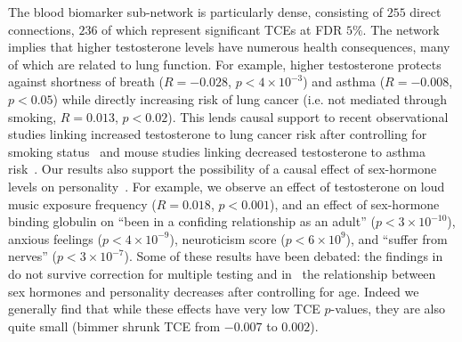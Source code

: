 \documentclass{article}
\begin{document}
The blood biomarker sub-network is particularly dense,
consisting of $255$ direct connections, $236$ of which represent
significant TCEs at FDR $5\%$.
The network implies that higher testosterone levels have numerous health consequences, many of
which are related to lung function. For example, higher testosterone protects against
shortness of breath ($R = -0.028$, $p < 4\times 10^{-3}$) and asthma ($R = -0.008$, $p < 0.05$)
while directly increasing risk of lung cancer (i.e. not mediated through smoking, $R = 0.013$, $p < 0.02$).
This lends causal support to
recent observational studies linking increased testosterone to lung cancer risk after controlling
for smoking status~\cite{Hyde2012}
and mouse studies linking decreased testosterone to asthma risk~\cite{Cephus2017}.
Our results also support the possibility of a causal effect of sex-hormone
levels on personality~\cite{Colangelo2012,Asselmann2019,Ekholm2014,Aluja2014}.
For example, we observe an effect of testosterone on loud
music exposure frequency ($R = 0.018$, $p < 0.001$), and
an effect of sex-hormone binding globulin on
``been in a confiding relationship as an adult'' ($p < 3 \times 10^{-10}$),
 anxious feelings ($p<4\times 10^{-9}$), neuroticism score ($p<6\times 10^{9}$), and ``suffer from nerves''
($p < 3\times 10^{-7}$). Some of these results have been debated: the findings in~\cite{Asselmann2019} do not survive correction for multiple testing and
in~\cite{Aluja2014} the relationship between sex hormones and personality decreases after controlling
for age. Indeed we generally find that while these effects have very low TCE $p$-values, they 
are also quite small (bimmer shrunk TCE from $-0.007$ to $0.002$).
\end{document}
